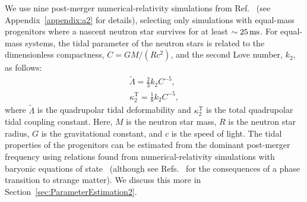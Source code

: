 \documentclass[../Thesis.tex]{subfiles}
\begin{document}
        We use nine post-merger numerical-relativity simulations from Ref.~\cite{Dietrich2018} (see Appendix~\ref{appendix:a2} for details), selecting only simulations with equal-mass progenitors where a nascent neutron star
        survives for at least $\sim\unit[25]{ms}$.
        For equal-mass systems, the tidal parameter of the neutron stars is related to the dimensionless compactness, $C=GM/(Rc^2)$, and the second Love number, $k_2$, as follows:
        \begin{align}
            \tilde{\Lambda} = \frac{2}{3} k_2 C^{-5}, \\
            \kappa_2^{\mathrm{T}} = \frac {1}{8}k_2 C^{-5},
        \end{align}
        where $\tilde{\Lambda}$ is the quadrupolar tidal deformability and $\kappa_2^{\mathrm{T}}$ is the total quadrupolar tidal coupling constant. 
        Here, $M$ is the neutron star mass, $R$ is the neutron star radius, $G$ is the gravitational constant, and $c$ is the speed of light. 
        The tidal properties of the progenitors can be estimated from the dominant post-merger frequency using relations found from numerical-relativity simulations with baryonic equations of state~\cite{Takami2015,Bauswein2019} (although see Refs.~\cite{Most2018b,Most2018,Bauswein2019} for the consequences of a phase transition to strange matter). 
        We discuss this more in Section~\ref{sec:ParameterEstimation2}.      \par
        
\end{document}

